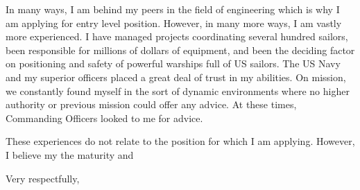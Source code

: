 \documentclass[11pt]{letter} %
\begin{document}
\begin{letter}
In many ways, I am behind my peers in the field of engineering which is why I am applying for entry level position. However, in many more ways, I am vastly more experienced. I have managed projects coordinating several hundred sailors, been responsible for millions of dollars of equipment, and been the deciding factor on positioning and safety of powerful warships full of US sailors. The US Navy and my superior officers placed a great deal of trust in my abilities. On mission, we constantly found myself in the sort of dynamic environments where no higher authority or previous mission could offer any advice. At these times, Commanding Officers looked to me for advice.

These experiences do not relate to the position for which I am applying. However, I believe my the maturity and
 
 
\closing{Very respectfully,}
 
 
\encl{}  				%

\end{letter}
 
\end{document}
